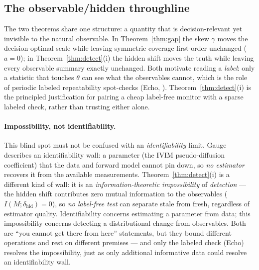 \subsection{The observable/hidden throughline}
\label{sec:throughline}

The two theorems share one structure: a quantity that is decision-relevant yet invisible to the
natural observable. In Theorem~\ref{thm:gap} the skew $\gamma$ moves the decision-optimal scale while
leaving symmetric coverage first-order unchanged ($a=0$); in Theorem~\ref{thm:detect}(i) the hidden shift
moves the truth while leaving every observable summary exactly unchanged. Both motivate reading a
\emph{label}: only a statistic that touches $\theta$ can see what the observables cannot, which is the
role of periodic labeled repeatability spot-checks (Echo, \citealp{echo}). Theorem~\ref{thm:detect}(i) is
the principled justification for pairing a cheap label-free monitor with a sparse labeled check, rather
than trusting either alone.

\paragraph{Impossibility, not identifiability.}
This blind spot must not be confused with an \emph{identifiability} limit. Gauge \citep{gauge}
describes an identifiability wall: a parameter (the IVIM pseudo-diffusion coefficient) that the data
and forward model cannot pin down, so \emph{no estimator} recovers it from the available
measurements. Theorem~\ref{thm:detect}(i) is a different kind of wall: it is an
\emph{information-theoretic impossibility} of \emph{detection} --- the hidden shift contributes zero
mutual information to the observables ($I(M;\delta_{\mathrm{hid}})=0$), so \emph{no label-free test}
can separate stale from fresh, regardless of estimator quality. Identifiability concerns estimating a
parameter from data; this impossibility concerns detecting a distributional change from observables.
Both are ``you cannot get there from here'' statements, but they bound different operations and rest on
different premises --- and only the labeled check (Echo) resolves the impossibility, just as only
additional informative data could resolve an identifiability wall.

